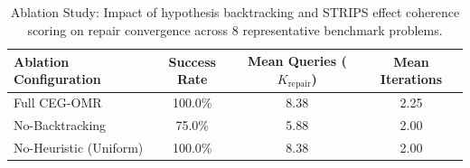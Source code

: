\begin{table}[t]
\centering
\caption{Ablation Study: Impact of hypothesis backtracking and STRIPS effect coherence scoring on repair convergence across 8 representative benchmark problems.}
\label{tab:ablation_results}
\small
\begin{tabular}{lccc}
\toprule
\textbf{Ablation Configuration} & \textbf{Success Rate} & \textbf{Mean Queries ($K_{\text{repair}}$)} & \textbf{Mean Iterations} \\
\midrule
Full CEG-OMR & 100.0\% & 8.38 & 2.25 \\
No-Backtracking & 75.0\% & 5.88 & 2.00 \\
No-Heuristic (Uniform) & 100.0\% & 8.38 & 2.00 \\
\bottomrule
\end{tabular}
\end{table}
